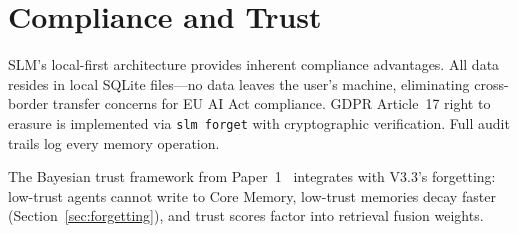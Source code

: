 \section{Compliance and Trust}
\label{sec:compliance}

SLM's local-first architecture provides inherent compliance advantages. All data resides in local SQLite files---no data leaves the user's machine, eliminating cross-border transfer concerns for EU AI Act compliance. GDPR Article~17 right to erasure is implemented via \texttt{slm forget} with cryptographic verification. Full audit trails log every memory operation.

The Bayesian trust framework from Paper~1~\cite{slm-paper1} integrates with V3.3's forgetting: low-trust agents cannot write to Core Memory, low-trust memories decay faster (Section~\ref{sec:forgetting}), and trust scores factor into retrieval fusion weights.

